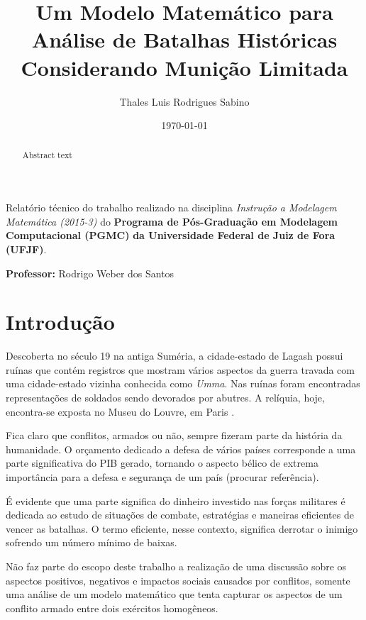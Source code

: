\documentclass{article}
\title{Um Modelo Matemático para Análise de Batalhas Históricas Considerando Munição Limitada} %
\author{Thales Luis Rodrigues Sabino} %
\date{\today} %
\begin{document}
\maketitle %

\begin{center}
Relatório técnico do trabalho realizado na disciplina \textit{Instrução a Modelagem Matemática (2015-3)} do \textbf{Programa de Pós-Graduação em Modelagem Computacional (PGMC)} \textbf{da Universidade Federal de Juiz de Fora (UFJF)}.
\end{center}


\begin{center}
\textbf{Professor:} Rodrigo Weber dos Santos
\end{center}

\begin{abstract}
Abstract text
\end{abstract}


\section{Introdução}

Descoberta no século 19 na antiga Suméria, a cidade-estado de Lagash possui ruínas que contém registros que mostram vários aspectos da guerra travada com uma cidade-estado vizinha conhecida como \textit{Umma}. Nas ruínas foram encontradas representações de soldados sendo devorados por abutres. A relíquia, hoje, encontra-se exposta no Museu do Louvre, em Paris \cite{firstwar}.

Fica claro que conflitos, armados ou não, sempre fizeram parte da história da humanidade. O orçamento dedicado a defesa de vários países corresponde a uma parte significativa do PIB gerado, tornando o aspecto bélico de extrema importância para a defesa e segurança de um país (procurar referência).

É evidente que uma parte significa do dinheiro investido nas forças militares é dedicada ao estudo de situações de combate, estratégias e maneiras eficientes de vencer as batalhas. O termo eficiente, nesse contexto, significa derrotar o inimigo sofrendo um número mínimo de baixas. 

Não faz parte do escopo deste trabalho a realização de uma discussão sobre os aspectos positivos, negativos e impactos sociais causados por conflitos, somente uma análise de um modelo  matemático que tenta capturar os aspectos de um conflito armado entre dois exércitos homogêneos.
\end{document}
